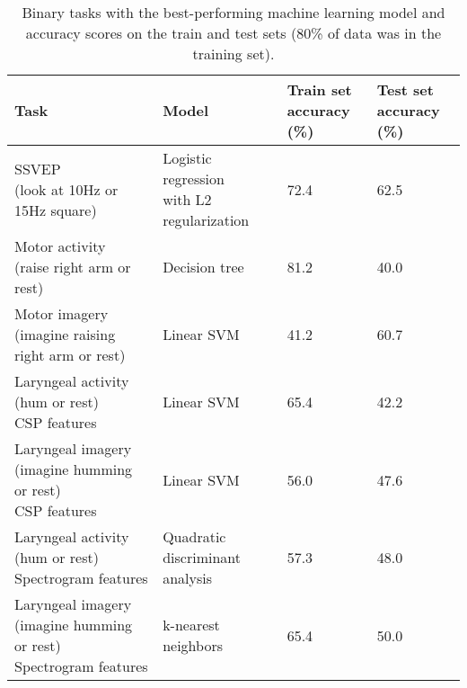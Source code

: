 \documentclass{article}
\begin{document}
\begin{table}[]
\centering
\begin{tabular}{|l|l|l|l|}
\hline
Task                                              & Model                                      & \thead{Train set\\ accuracy (\%)} & \thead{Test set\\ accuracy (\%)} \\
\hline
\makecell{SSVEP\\ (look at 10Hz or 15Hz square)}               & \makecell{Logistic regression\\with L2 regularization} & 72.4               & 62.5              \\
\hline
\makecell{Motor activity \\ (raise right arm or rest)}          & Decision tree                                   & 81.2               & 40.0              \\
\hline
\makecell{Motor imagery\\ (imagine raising right arm or rest)} & Linear SVM                        & 41.2               & 60.7              \\
\hline
\makecell{Laryngeal activity \\ (hum or rest) \\ CSP features}                  & Linear SVM                        & 65.4               & 42.2              \\
\hline
\makecell{Laryngeal imagery\\ (imagine humming or rest) \\ CSP features}       & Linear SVM                          & 56.0               & 47.6   \\
\hline
\makecell{Laryngeal activity \\ (hum or rest) \\ Spectrogram features}                  & \makecell{Quadratic discriminant\\ analysis}                       & 57.3               & 48.0              \\
\hline
\makecell{Laryngeal imagery\\ (imagine humming or rest) \\ Spectrogram features}       & k-nearest neighbors                          & 65.4               & 50.0   \\
\hline
\end{tabular}
\caption{Binary tasks with the best-performing machine learning model and accuracy scores on the train and test sets (80\% of data was in the training set).}
\label{accuracies}
\end{table}
\end{document}
